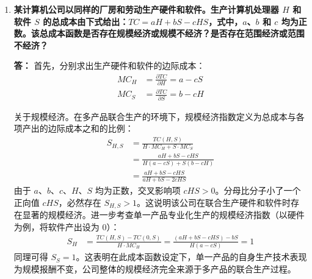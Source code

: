 \begin{enumerate}[label=\textbf{\arabic*.}, leftmargin=*]
\begin{center}
		\end{center}
		\newpage
		\item \textbf{某计算机公司以同样的厂房和劳动生产硬件和软件。生产计算机处理器 $H$ 和软件 $S$ 的总成本由下式给出：$TC = aH + bS - cHS$，式中，$a$、$b$ 和 $c$ 均为正数。该总成本函数是否存在规模经济或规模不经济？是否存在范围经济或范围不经济？}
		
		\textbf{答：}
		首先，分别求出生产硬件和软件的边际成本：
		\[
		\begin{aligned}
			MC_H &= \frac{\partial TC}{\partial H} = a - cS \\
			MC_S &= \frac{\partial TC}{\partial S} = b - cH
		\end{aligned}
		\]
		
		关于规模经济。在多产品联合生产的环境下，规模经济指数定义为总成本与各项产出的边际成本之和的比例：
		\[
		\begin{aligned}
			S_{H, S} &= \frac{TC(H, S)}{H \cdot MC_H + S \cdot MC_S} \\
			&= \frac{aH + bS - cHS}{H(a - cS) + S(b - cH)} \\
			&= \frac{aH + bS - cHS}{aH + bS - 2cHS}
		\end{aligned}
		\]
		由于 $a$、$b$、$c$、$H$、$S$ 均为正数，交叉影响项 $cHS > 0$。分母比分子小了一个正向值 $cHS$，必然存在 $S_{H, S} > 1$。这说明该公司在联合生产硬件和软件时存在显著的规模经济。进一步考查单一产品专业化生产的规模经济指数（以硬件为例，将软件产出设为 $0$）：
		\[
		\begin{aligned}
			S_H &= \frac{TC(H, S) - TC(0, S)}{H \cdot MC_H} = \frac{(aH + bS - cHS) - bS}{H(a - cS)} = 1
		\end{aligned}
		\]
		同理可得 $S_S = 1$。这表明在此成本函数设定下，单一产品的自身生产技术表现为规模报酬不变，公司整体的规模经济完全来源于多产品的联合生产过程。
		

\end{enumerate}
